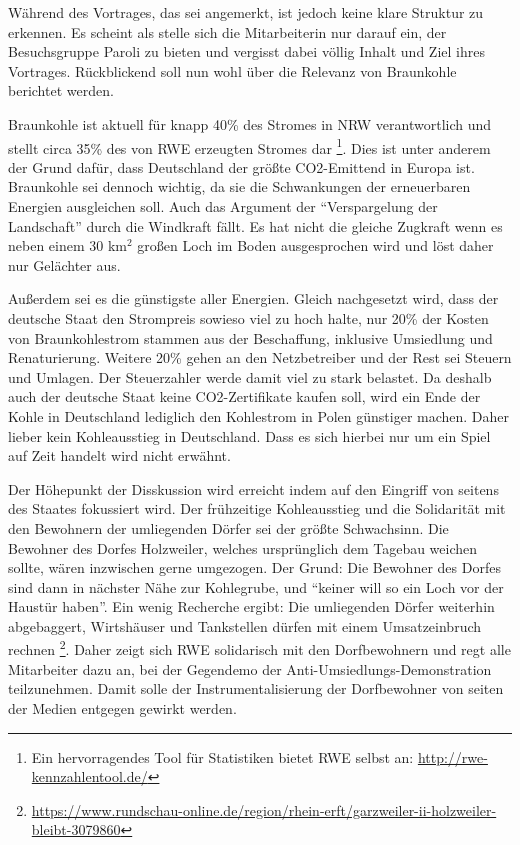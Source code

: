 \documentclass{article}
\begin{document}
Während des Vortrages, das sei angemerkt, ist jedoch keine klare Struktur zu erkennen.
Es scheint als stelle sich die Mitarbeiterin nur darauf ein, der Besuchsgruppe Paroli zu bieten und vergisst dabei
völlig Inhalt und Ziel ihres Vortrages.
Rückblickend soll nun wohl über die Relevanz von Braunkohle berichtet werden.

Braunkohle ist aktuell für knapp 40\% des Stromes in NRW verantwortlich und stellt circa 35\% des von RWE erzeugten Stromes dar
\footnote{Ein hervorragendes Tool für Statistiken bietet RWE selbst an: \url{http://rwe-kennzahlentool.de/}}.
Dies ist unter anderem der Grund dafür, dass Deutschland der größte CO2-Emittend in Europa ist.
Braunkohle sei dennoch wichtig, da sie die Schwankungen der erneuerbaren Energien ausgleichen soll.
Auch das Argument der \enquote{Verspargelung der Landschaft} durch die Windkraft fällt.
Es hat nicht die gleiche Zugkraft wenn es neben einem 30 km$^2$ großen Loch im Boden ausgesprochen wird und löst daher nur Gelächter aus.

Außerdem sei es die günstigste aller Energien.
Gleich nachgesetzt wird, dass der deutsche Staat den Strompreis sowieso viel zu hoch halte,
nur 20\% der Kosten von Braunkohlestrom stammen aus der Beschaffung, inklusive Umsiedlung und Renaturierung.
Weitere 20\% gehen an den Netzbetreiber und der Rest sei Steuern und Umlagen.
Der Steuerzahler werde damit viel zu stark belastet.
Da deshalb auch der deutsche Staat keine CO2-Zertifikate kaufen soll,
wird ein Ende der Kohle in Deutschland lediglich den Kohlestrom in Polen günstiger machen.
Daher lieber kein Kohleausstieg in Deutschland.
Dass es sich hierbei nur um ein Spiel auf Zeit handelt wird nicht erwähnt.

Der Höhepunkt der Disskussion wird erreicht indem auf den Eingriff von seitens des Staates fokussiert wird.
Der frühzeitige Kohleausstieg und die Solidarität mit den Bewohnern der umliegenden Dörfer sei der größte Schwachsinn.
Die Bewohner des Dorfes Holzweiler, welches ursprünglich dem Tagebau weichen sollte, wären inzwischen gerne umgezogen.
Der Grund: Die Bewohner des Dorfes sind dann in nächster Nähe zur Kohlegrube, und \enquote{keiner will so ein Loch vor der Haustür haben}.
Ein wenig Recherche ergibt: Die umliegenden Dörfer weiterhin abgebaggert, Wirtshäuser und Tankstellen dürfen mit einem
Umsatzeinbruch rechnen \footnote{\url{https://www.rundschau-online.de/region/rhein-erft/garzweiler-ii-holzweiler-bleibt-3079860}}.
Daher zeigt sich RWE solidarisch mit den Dorfbewohnern und regt alle Mitarbeiter dazu an, bei der Gegendemo der Anti-Umsiedlungs-Demonstration
teilzunehmen. Damit solle der Instrumentalisierung der Dorfbewohner von seiten der Medien entgegen gewirkt werden.
\end{document}
